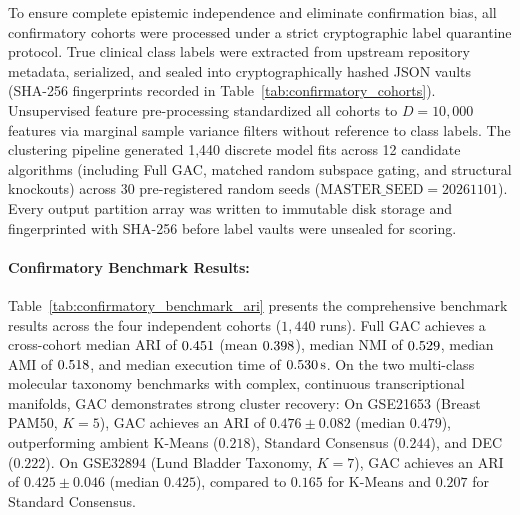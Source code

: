 \documentclass[pdflatex,sn-mathphys-num]{sn-jnl}
\theoremstyle{thmstyleone}
\theoremstyle{thmstyletwo}
\theoremstyle{thmstylethree}
\begin{document}


To ensure complete epistemic independence and eliminate confirmation bias, all confirmatory cohorts were processed under a strict cryptographic label quarantine protocol. True clinical class labels were extracted from upstream repository metadata, serialized, and sealed into cryptographically hashed JSON vaults (SHA-256 fingerprints recorded in Table~\ref{tab:confirmatory_cohorts}). Unsupervised feature pre-processing standardized all cohorts to $D = 10{,}000$ features via marginal sample variance filters without reference to class labels. The clustering pipeline generated 1,440 discrete model fits across 12 candidate algorithms (including Full GAC, matched random subspace gating, and structural knockouts) across 30 pre-registered random seeds ($\text{MASTER\_SEED}=20261101$). Every output partition array was written to immutable disk storage and fingerprinted with SHA-256 before label vaults were unsealed for scoring.



\paragraph{Confirmatory Benchmark Results:}
Table~\ref{tab:confirmatory_benchmark_ari} presents the comprehensive benchmark results across the four independent cohorts ($1{,}440$ runs). Full GAC achieves a cross-cohort median ARI of $0.451$ (mean $0.398$), median NMI of $0.529$, median AMI of $0.518$, and median execution time of $0.530\,\text{s}$. On the two multi-class molecular taxonomy benchmarks with complex, continuous transcriptional manifolds, GAC demonstrates strong cluster recovery:
On GSE21653 (Breast PAM50, $K=5$), GAC achieves an ARI of $0.476 \pm 0.082$ (median $0.479$), outperforming ambient K-Means ($0.218$), Standard Consensus ($0.244$), and DEC ($0.222$).
On GSE32894 (Lund Bladder Taxonomy, $K=7$), GAC achieves an ARI of $0.425 \pm 0.046$ (median $0.425$), compared to $0.165$ for K-Means and $0.207$ for Standard Consensus.


\end{document}
